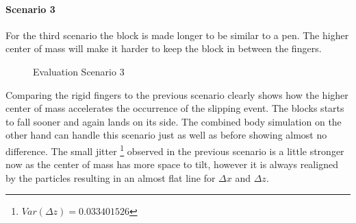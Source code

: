 \clearpage
\paragraph{Scenario 3}
For the third scenario the block is made longer to be similar to a pen. The higher center of mass will make it harder to keep the block in between the fingers.

\begin{figure}[htb]
	\centering
	\caption{Evaluation Scenario 3}
\end{figure}

Comparing the rigid fingers to the previous scenario clearly shows how the higher center of mass accelerates the occurrence of the slipping event. The blocks starts to fall sooner and again lands on its side. The combined body simulation on the other hand can handle this scenario just as well as before showing almost no difference. The small jitter \footnote{$Var(\Delta z)=0.033401526$} observed in the previous scenario is a little stronger now as the center of mass has more space to tilt, however it is always realigned by the particles resulting in an almost flat line for $\Delta x$ and $\Delta z$.

